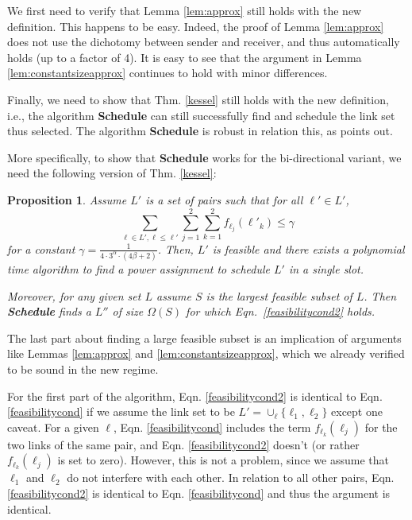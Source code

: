 \documentclass[11pt]{amsart}
\newtheorem{proposition}{Proposition}[section]
\begin{document}
We first need to verify that Lemma \ref{lem:approx} still holds with the new definition. This happens to be easy. Indeed, the proof of Lemma \ref{lem:approx} does not use the dichotomy between sender and receiver, and thus automatically holds (up to a factor of 4). It is easy to see that the argument in Lemma \ref{lem:constantsizeapprox} continues to hold with minor differences.

Finally, we need to show that Thm. \ref{kessel} still holds with the new definition, i.e., the algorithm \textbf{Schedule} can still successfully find
and schedule the link set thus selected. The algorithm \textbf{Schedule} is robust in relation this, as \cite{KesselheimSoda11} points out. 

More specifically, to show that \textbf{Schedule} works for the bi-directional variant, we need the following version of 
Thm. \ref{kessel}:

\begin{proposition}
Assume $L'$ is a set of pairs such that for all $\ell' \in L'$,
\begin{equation}
\sum_{\ell \in L', \ell \leq \ell'} \sum_{j=1}^2 \sum_{k=1}^2 f_{\ell_j}(\ell'_k) \leq \gamma
\label{feasibilitycond2}
\end{equation}
for a constant $\gamma = \frac{1}{4 \cdot 3^{\alpha} \cdot (4 \beta + 2)}$.
Then, $L'$ is feasible and there exists a polynomial time algorithm to find a power assignment to schedule $L'$ in a single slot.

Moreover, for any given set $L$ assume $S$ is the largest feasible subset of $L$. Then \textbf{Schedule} finds a $L''$ of size $\Omega(S)$ for which Eqn.~\ref{feasibilitycond2} holds.
\label{kessel2}
\end{proposition}


The last part about finding a large feasible subset is an implication of arguments like Lemmas \ref{lem:approx} and \ref{lem:constantsizeapprox}, which we already verified to be sound in the new regime.

For the first part of the algorithm, Eqn. \ref{feasibilitycond2} is
identical to Eqn. \ref{feasibilitycond} if we assume the link set to
be $L' = \cup_{\ell} \{\ell_1, \ell_2\}$ except one caveat. For a
given $\ell$, Eqn. \ref{feasibilitycond} includes the term
$f_{\ell_k}(\ell_j)$ for the two links of the same pair, and
Eqn. \ref{feasibilitycond2} doesn't (or rather $f_{\ell_k}(\ell_j)$ is
set to zero). However, this is not a problem, since we assume that
$\ell_1$ and $\ell_2$ do not interfere with each other. In relation to
all other pairs, Eqn. \ref{feasibilitycond2} is identical to
Eqn. \ref{feasibilitycond} and thus the argument is identical.  
\end{document}
